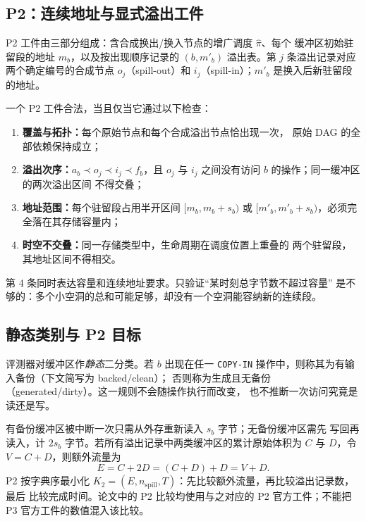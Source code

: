 \subsection{P2：连续地址与显式溢出工件}

P2 工件由三部分组成：含合成换出/换入节点的增广调度 $\widehat\pi$、每个
缓冲区初始驻留段的地址 $m_b$，以及按出现顺序记录的
$(b,m'_b)$ 溢出表。第 $j$ 条溢出记录对应两个确定编号的合成节点
$o_j$（spill-out）和 $i_j$（spill-in）；$m'_b$ 是换入后新驻留段的地址。

一个 P2 工件合法，当且仅当它通过以下检查：
\begin{enumerate}
  \item \textbf{覆盖与拓扑：}每个原始节点和每个合成溢出节点恰出现一次，
        原始 DAG 的全部依赖保持成立；
  \item \textbf{溢出次序：}$a_b\prec o_j\prec i_j\prec f_b$，且
        $o_j$ 与 $i_j$ 之间没有访问 $b$ 的操作；同一缓冲区的两次溢出区间
        不得交叠；
  \item \textbf{地址范围：}每个驻留段占用半开区间
        $[m_b,m_b+s_b)$ 或 $[m'_b,m'_b+s_b)$，必须完全落在其存储容量内；
  \item \textbf{时空不交叠：}同一存储类型中，生命周期在调度位置上重叠的
        两个驻留段，其地址区间不得相交。
\end{enumerate}
第 4 条同时表达容量和连续地址要求。只验证“某时刻总字节数不超过容量”
是不够的：多个小空洞的总和可能足够，却没有一个空洞能容纳新的连续段。

\subsection{静态类别与 P2 目标}

评测器对缓冲区作\emph{静态}二分类。若 $b$ 出现在任一
\texttt{COPY-IN} 操作中，则称其为有输入备份（下文简写为 backed/clean）；
否则称为生成且无备份（generated/dirty）。这一规则不会随操作执行而改变，
也不推断一次访问究竟是读还是写。

有备份缓冲区被中断一次只需从外存重新读入 $s_b$ 字节；无备份缓冲区需先
写回再读入，计 $2s_b$ 字节。若所有溢出记录中两类缓冲区的累计原始体积为
$C$ 与 $D$，令 $V=C+D$，则额外流量为
\begin{equation}\label{eq:supp-extra-zh}
 E=C+2D=(C+D)+D=V+D.
\end{equation}
P2 按字典序最小化
$K_2=(E,n_{\mathrm{spill}},T)$：先比较额外流量，再比较溢出记录数，最后
比较完成时间。论文中的 P2 比较均使用与之对应的 P2 官方工件；不能把 P3
官方工件的数值混入该比较。

